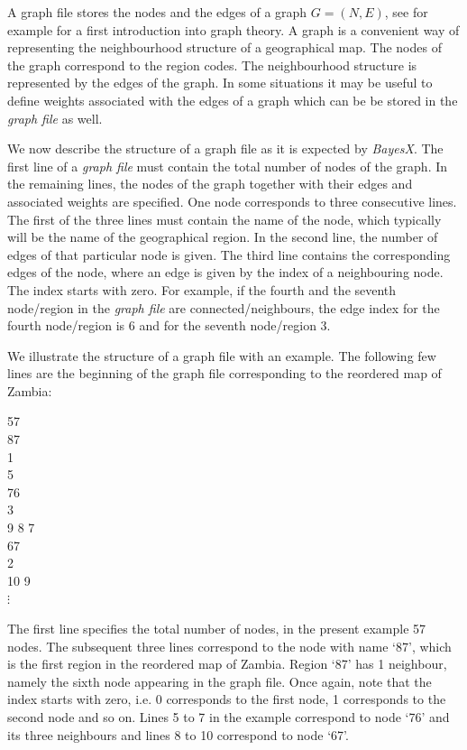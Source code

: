 A graph file stores the nodes and the edges of a graph $G = (N,E)$, see for example  for a first
introduction into graph theory. A graph is a convenient way of representing the neighbourhood structure of a geographical map.
The nodes of the graph correspond to the region codes. The neighbourhood structure is represented by the edges of the graph. In
some situations it may be useful to define weights associated with the edges of a graph which can be be stored in the {\it
graph file} as well.

We now describe the structure of a graph file as it is expected by {\it BayesX}. The first line of a {\it graph file} must
contain the total number of nodes of the graph. In the remaining lines, the nodes of the graph together with their edges and
associated weights are specified. One node corresponds to three consecutive lines. The first of the three lines must contain
the name of the node, which typically will be the name of the geographical region. In the second line, the number of edges of
that particular node is given. The third line contains the corresponding edges of the node, where an edge is given by the index
of a neighbouring node. The index starts with zero. For example, if the fourth and the seventh node/region in the {\it graph
file} are connected/neighbours, the edge index for the fourth node/region is 6 and for the seventh node/region 3.

We illustrate the structure of a graph file with an example. The following few lines are the beginning of the graph file
corresponding to the reordered map of Zambia:

\footnotesize

 57\\
 87\\
 1\\
 5\\
 76\\
 3\\
 9 8 7\\
 67\\
 2\\
 10 9\\

\hspace{1cm} $\vdots$

\normalsize

\vspace{0.5cm}

The first line specifies the total number of nodes, in the present example 57 nodes. The subsequent three lines correspond to
the node with name `87', which is the first region in the reordered map of Zambia. Region `87' has 1 neighbour, namely the
sixth node appearing in the graph file. Once again, note that the index starts with zero, i.e. 0 corresponds to the first node,
1 corresponds to the second node and so on. Lines 5 to 7 in the example correspond to node `76' and its three neighbours and
lines 8 to 10 correspond to node `67'.

